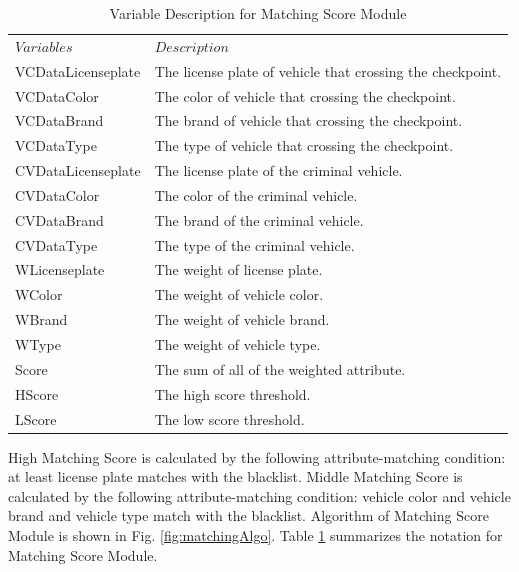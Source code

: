 \documentclass{llncs}
\begin{document}
\begin{table}
\caption{Variable Description for Matching Score Module}
\label{table_variableMatching}
\begin{center}
\renewcommand{\arraystretch}{1.4}
\setlength\tabcolsep{3pt}
\begin{tabular}{ll}
\hline\noalign{\smallskip}
$Variables$ & $Description$\\
\noalign{\smallskip}
\hline
\noalign{\smallskip}
 VCDataLicenseplate & The license plate of vehicle that crossing the checkpoint. \\
VCDataColor & The color of vehicle that crossing the checkpoint.\\
VCDataBrand & The brand of vehicle that crossing the checkpoint.\\
VCDataType & The type of vehicle that crossing the checkpoint.\\
CVDataLicenseplate & The license plate of the criminal vehicle.\\
CVDataColor & The color of the criminal vehicle.\\
CVDataBrand & The brand of the criminal vehicle.\\
CVDataType & The type of the criminal vehicle.\\
WLicenseplate & The weight of license plate.\\
WColor & The weight of vehicle color.\\
WBrand & The weight of vehicle brand.\\
WType & The weight of vehicle type.\\
Score & The sum of all of the weighted attribute.\\
HScore & The high score threshold.\\
LScore & The low score threshold.\\
\hline
\end{tabular}
\end{center}
\end{table}

High Matching Score is calculated by the following attribute-matching condition: at least license plate matches with the blacklist.
Middle Matching Score is calculated by the following attribute-matching condition: vehicle color and vehicle brand and vehicle type match with the blacklist. 
Algorithm of Matching Score Module is shown in Fig. \ref{fig:matchingAlgo}. Table \ref{table_variableMatching} summarizes the notation for Matching Score Module.
\end{document}
